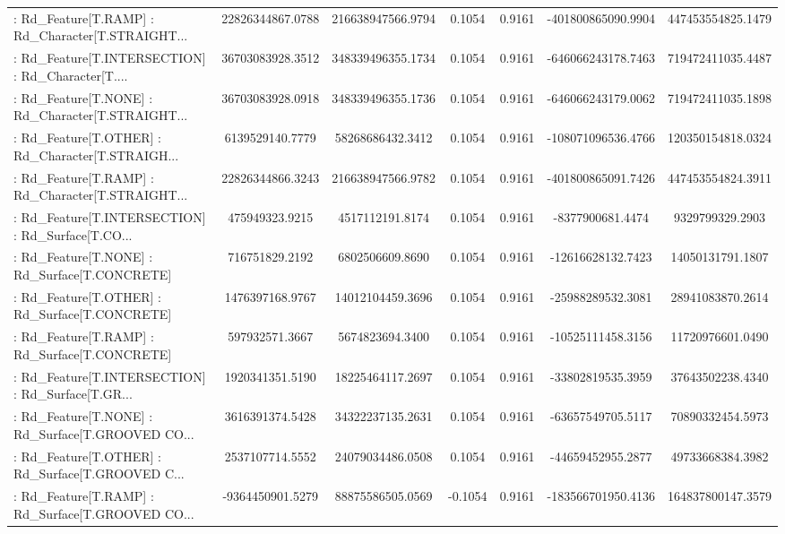 \begin{longtable}{p{4cm}cccccc}
 : Rd\_Feature[T.RAMP] : Rd\_Character[T.STRAIGHT... &  22826344867.0788 & 216638947566.9794 &  0.1054 &       0.9161 & -401800865090.9904 & 447453554825.1479 \\
 : Rd\_Feature[T.INTERSECTION] : Rd\_Character[T.... &  36703083928.3512 & 348339496355.1734 &  0.1054 &       0.9161 & -646066243178.7463 & 719472411035.4487 \\
 : Rd\_Feature[T.NONE] : Rd\_Character[T.STRAIGHT... &  36703083928.0918 & 348339496355.1736 &  0.1054 &       0.9161 & -646066243179.0062 & 719472411035.1898 \\
 : Rd\_Feature[T.OTHER] : Rd\_Character[T.STRAIGH... &   6139529140.7779 &  58268686432.3412 &  0.1054 &       0.9161 & -108071096536.4766 & 120350154818.0324 \\
 : Rd\_Feature[T.RAMP] : Rd\_Character[T.STRAIGHT... &  22826344866.3243 & 216638947566.9782 &  0.1054 &       0.9161 & -401800865091.7426 & 447453554824.3911 \\
 : Rd\_Feature[T.INTERSECTION] : Rd\_Surface[T.CO... &    475949323.9215 &   4517112191.8174 &  0.1054 &       0.9161 &   -8377900681.4474 &   9329799329.2903 \\
 : Rd\_Feature[T.NONE] : Rd\_Surface[T.CONCRETE]     &    716751829.2192 &   6802506609.8690 &  0.1054 &       0.9161 &  -12616628132.7423 &  14050131791.1807 \\
 : Rd\_Feature[T.OTHER] : Rd\_Surface[T.CONCRETE]    &   1476397168.9767 &  14012104459.3696 &  0.1054 &       0.9161 &  -25988289532.3081 &  28941083870.2614 \\
 : Rd\_Feature[T.RAMP] : Rd\_Surface[T.CONCRETE]     &    597932571.3667 &   5674823694.3400 &  0.1054 &       0.9161 &  -10525111458.3156 &  11720976601.0490 \\
 : Rd\_Feature[T.INTERSECTION] : Rd\_Surface[T.GR... &   1920341351.5190 &  18225464117.2697 &  0.1054 &       0.9161 &  -33802819535.3959 &  37643502238.4340 \\
 : Rd\_Feature[T.NONE] : Rd\_Surface[T.GROOVED CO... &   3616391374.5428 &  34322237135.2631 &  0.1054 &       0.9161 &  -63657549705.5117 &  70890332454.5973 \\
 : Rd\_Feature[T.OTHER] : Rd\_Surface[T.GROOVED C... &   2537107714.5552 &  24079034486.0508 &  0.1054 &       0.9161 &  -44659452955.2877 &  49733668384.3982 \\
 : Rd\_Feature[T.RAMP] : Rd\_Surface[T.GROOVED CO... &  -9364450901.5279 &  88875586505.0569 & -0.1054 &       0.9161 & -183566701950.4136 & 164837800147.3579 \\

\end{longtable}
